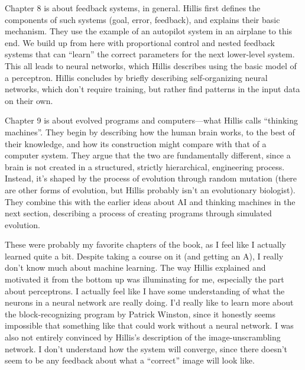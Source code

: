 \documentclass[12pt]{article}
\begin{document}

\pagestyle{fancy}
\fancyhead{} %


Chapter 8 is about feedback systems, in general. Hillis first defines the
components of such systems (goal, error, feedback), and explains their basic
mechanism. They use the example of an autopilot system in an airplane to this
end. We build up from here with proportional control and nested feedback
systems that can ``learn'' the correct parameters for the next lower-level
system. This all leads to neural networks, which Hillis describes using the
basic model of a perceptron. Hillis concludes by briefly describing
self-organizing neural networks, which don't require training, but rather find
patterns in the input data on their own.

Chapter 9 is about evolved programs and computers---what Hillis calls
``thinking machines''. They begin by describing how the human brain works, to
the best of their knowledge, and how its construction might compare with that
of a computer system. They argue that the two are fundamentally different,
since a brain is not created in a structured, strictly hierarchical,
engineering process. Instead, it's shaped by the process of evolution through
random mutation (there are other forms of evolution, but Hillis probably isn't
an evolutionary biologist). They combine this with the earlier ideas about AI
and thinking machines in the next section, describing a process of creating
programs through simulated evolution.

\vspace{1em}

These were probably my favorite chapters of the book, as I feel like I actually
learned quite a bit. Despite taking a course on it (and getting an A), I really
don't know much about machine learning. The way Hillis explained and motivated
it from the bottom up was illuminating for me, especially the part about
perceptrons. I actually feel like I have some understanding of what the neurons
in a neural network are really doing. I'd really like to learn more about the
block-recognizing program by Patrick Winston, since it honestly seems
impossible that something like that could work without a neural network. I was
also not entirely convinced by Hillis's description of the image-unscrambling
network. I don't understand how the system will converge, since there doesn't
seem to be any feedback about what a ``correct'' image will look like.
\end{document}
